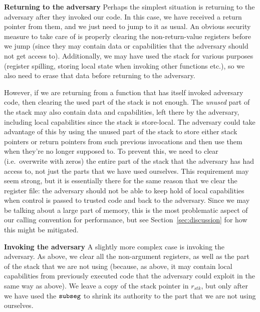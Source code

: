 \documentclass[compsoc,conference,letterpaper,fleqn]{IEEEtran}
\newcommand{\var}[1]{\mathit{#1}}
\newcommand{\stk}{\var{stk}}
\newcommand{\zinstr}[1]{\mathtt{#1}}
\newcommand{\threeinstr}[4]{
  \ifthenelse{\equal{#2#3#4}{}}
  {\zinstr{#1}}
  {\zinstr{#1} \; #2 \; #3 \; #4}
}
\newcommand{\subseg}[3]{\threeinstr{subseg}{#1}{#2}{#3}}
\begin{document}
\textbf{Returning to the adversary} Perhaps the simplest situation is returning
to the adversary after they invoked our code. In this case, we have received a
return pointer from them, and we just need to jump to it as usual. An obvious
security measure to take care of is properly clearing the non-return-value
registers before we jump (since they may contain data or capabilities that the
adversary should not get access to). Additionally, we may have used the stack
for various purposes (register spilling, storing local state when invoking other
functions etc.), so we also need to erase that data before returning to the
adversary.

However, if we are returning from a function that has itself invoked adversary
code, then clearing the used part of the stack is not enough. The \emph{unused}
part of the stack may also contain data and capabilities, left there by the
adversary, including local capabilities since the stack is store-local. The
adversary could take advantage of this by using the unused part of the stack to
store either stack pointers or return pointers from such previous invocations
and then use them when they're no longer supposed to. To prevent this, we need
to clear (i.e.\ overwrite with zeros) the entire part of the stack that the
adversary has had access to, not just the parts that we have used ourselves.
This requirement may seem strong, but it is essentially there for the same
reason that we clear the register file: the adversary should not be able to keep
hold of local capabilities when control is passed to trusted code and back to
the adversary. Since we may be talking about a large part of memory, this is the
most problematic aspect of our calling convention for performance, but see
Section~\ref{sec:discussion} for how this might be mitigated.

\textbf{Invoking the adversary} A slightly more complex case is invoking the
adversary. As above, we clear all the non-argument registers, as well as the
part of the stack that we are not using (because, as above, it may contain local
capabilities from previously executed code that the adversary could exploit in
the same way as above). We leave a copy of the stack pointer in $r_\stk$, but
only after we have used the $\subseg{}{}{}$ to shrink its authority to the part
that we are not using ourselves.
\end{document}
